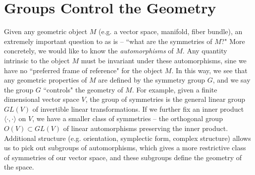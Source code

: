 \documentclass[abstract=on,twoside]{scrreprt}
\begin{document}
\section*{Groups Control the Geometry}
%
Given any geometric object $M$ (e.g. a vector space, manifold, fiber bundle), an
extremely important question to as is -- ``what are the symmetries of $M$?" More
concretely, we would like to know the \emph{automorphisms} of $M$. Any quantity
intrinsic to the object $M$ must be invariant under these automorphisms, sine
we have no ``preferred frame of reference" for the object $M$. In this way, we
see that any geometric properties of $M$ are defined by the symmetry group $G$,
and we say the group $G$ ``controls" the geometry of $M$. For example, given
a finite dimensional vector space $V$, the group of symmetries is the general
linear group $GL(V)$ of invertible linear transformations. If we further fix an
inner product $\langle\cdot,\cdot\rangle$ on $V$, we have a smaller class of
symmetries -- the orthogonal group $O(V) \subset GL(V)$ of linear automorphisms
preserving the inner product. Additional structure (e.g. orientation, symplectic
form, complex structure) allows us to pick out subgroups  of automorphisms, which gives
a more restrictive class of symmetries of our vector space, and these subgroups
define the geometry of the space. \\
\end{document}
